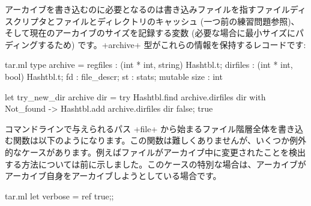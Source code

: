 \begin{answer}
アーカイブを書き込むのに必要となるのは書き込みファイルを指すファイルディスクリプタとファイルとディレクトリのキャッシュ (一つ前の練習問題参照)、 そして現在のアーカイブのサイズを記録する変数 (必要な場合に最小サイズにパディングするため) です。\ml+archive+ 型がこれらの情報を保持するレコードです:
%
\begin{listingcodefile}{tar.ml}
type archive =
    { regfiles : (int * int, string) Hashtbl.t;
      dirfiles : (int * int, bool) Hashtbl.t;
      fd : file_descr; st : stats; mutable size : int }

let try_new_dir archive dir =
  try Hashtbl.find archive.dirfiles dir
  with Not_found -> Hashtbl.add archive.dirfiles dir false; true
\end{listingcodefile}
%
コマンドラインで与えられるパス \ml+file+ から始まるファイル階層全体を書き込む関数は以下のようになります。この関数は難しくありませんが、いくつか例外的なケースがあります。例えばファイルがアーカイブ中に変更されたことを検出する方法については前に示しました。このケースの特別な場合は、アーカイブがアーカイブ自身をアーカイブしようとしている場合です。
%
\begin{listingcodefile}{tar.ml}
let verbose = ref true;;


\end{listingcodefile}
\end{answer}
